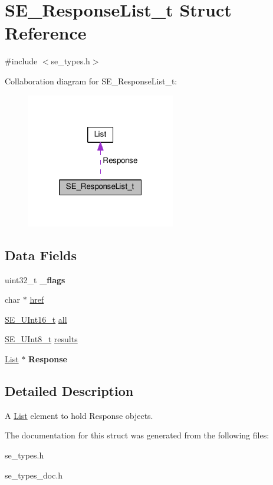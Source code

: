 \hypertarget{structSE__ResponseList__t}{}\section{S\+E\+\_\+\+Response\+List\+\_\+t Struct Reference}
\label{structSE__ResponseList__t}


{\ttfamily \#include $<$se\+\_\+types.\+h$>$}



Collaboration diagram for S\+E\+\_\+\+Response\+List\+\_\+t\+:\nopagebreak
\begin{figure}[H]
\begin{center}
\leavevmode
\includegraphics[width=184pt]{structSE__ResponseList__t__coll__graph}
\end{center}
\end{figure}
\subsection*{Data Fields}
\begin{DoxyCompactItemize}
\item 
uint32\+\_\+t {\bfseries \+\_\+flags}
\item 
char $\ast$ \hyperlink{group__ResponseList_ga32523c09761d4f0cd43b3dae1bb3c9d9}{href}
\item 
\hyperlink{group__UInt16_gac68d541f189538bfd30cfaa712d20d29}{S\+E\+\_\+\+U\+Int16\+\_\+t} \hyperlink{group__ResponseList_ga7055f5d4b853f35d0ea603f85154c53c}{all}
\item 
\hyperlink{group__UInt8_gaf7c365a1acfe204e3a67c16ed44572f5}{S\+E\+\_\+\+U\+Int8\+\_\+t} \hyperlink{group__ResponseList_ga45065ab96f53805ad13f19fa4593f52f}{results}
\item 
\hyperlink{structList}{List} $\ast$ {\bfseries Response}
\end{DoxyCompactItemize}


\subsection{Detailed Description}
A \hyperlink{structList}{List} element to hold Response objects. 

The documentation for this struct was generated from the following files\+:\begin{DoxyCompactItemize}
\item 
se\+\_\+types.\+h\item 
se\+\_\+types\+\_\+doc.\+h\end{DoxyCompactItemize}
